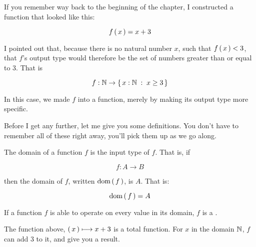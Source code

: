 
If you remember way back to the beginning of the chapter, I constructed a
function that looked like this:

\begin{equation}
    f \left(\, x \,\right) = x + 3
\end{equation}

I pointed out that, because there is no natural number $x$, such that
$f \left(\, x \,\right) < 3$, that $f$'s output type would therefore be the set of numbers
greater than or equal to 3. That is

\begin{equation}
    f : \mathbb{N} \to \left\{\, x : \mathbb{N}\; : \; x \ge 3 \,\right\}
\end{equation}

In this case, we made $f$ into a  function, merely by making
its output type more specific.

Before I get any further, let me give you some definitions. You don't have to
remember all of these right away, you'll pick them up as we go along.

\begin{definition}[Domain]
    The domain of a function $f$ is the input type of $f$. That is, if

    \begin{equation}
        f : A \to B
    \end{equation}

    then the domain of $f$, written $\text{dom} \left(\, f \,\right)$, is $A$. That is:

    \begin{equation}
        \text{dom} \left(\, f \,\right) = A
    \end{equation}
\end{definition}

\begin{definition}
    If a function $f$ is able to operate on every value in its domain, $f$ is a
    .

    The function above, $\left(\, x \,\right) \longmapsto x + 3$ is a total function. For  $x$
    in the domain $\mathbb{N}$, $f$ can add $3$ to it, and give you a result.
\end{definition}

